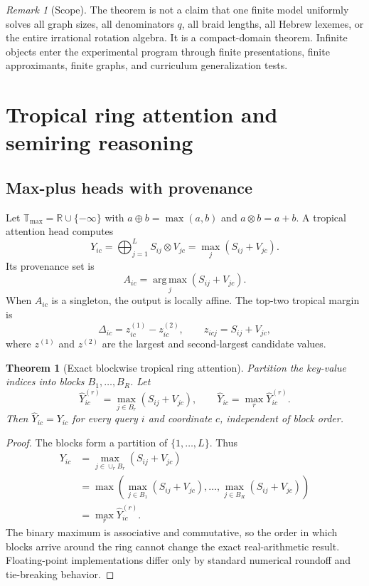 \documentclass[11pt]{article}
\theoremstyle{definition}
\theoremstyle{plain}
\newtheorem{theorem}[definition]{Theorem}
\theoremstyle{remark}
\newtheorem{remark}[definition]{Remark}
\numberwithin{equation}{section}
\newcommand{\R}{\mathbb{R}}
\newcommand{\T}{\mathbb{T}}
\newcommand{\argmax}{\operatorname*{arg\,max}}
\begin{document}
\begin{remark}[Scope]
The theorem is not a claim that one finite model uniformly solves all graph sizes, all denominators $q$, all braid lengths, all Hebrew lexemes, or the entire irrational rotation algebra.  It is a compact-domain theorem.  Infinite objects enter the experimental program through finite presentations, finite approximants, finite graphs, and curriculum generalization tests.
\end{remark}

\section{Tropical ring attention and semiring reasoning}

\subsection{Max-plus heads with provenance}

Let $\T_{\max}=\R\cup\{-\infty\}$ with $a\oplus b=\max(a,b)$ and $a\otimes b=a+b$.  A tropical attention head computes
\begin{equation}
  Y_{ic}=\bigoplus_{j=1}^L S_{ij}\otimes V_{jc}=\max_j(S_{ij}+V_{jc}).
\end{equation}
Its provenance set is
\begin{equation}
  A_{ic}=\argmax_j(S_{ij}+V_{jc}).
\end{equation}
When $A_{ic}$ is a singleton, the output is locally affine.  The top-two tropical margin is
\begin{equation}
  \Delta_{ic}=z_{ic}^{(1)}-z_{ic}^{(2)},\qquad z_{icj}=S_{ij}+V_{jc},
\end{equation}
where $z^{(1)}$ and $z^{(2)}$ are the largest and second-largest candidate values.

\begin{theorem}[Exact blockwise tropical ring attention]
Partition the key-value indices into blocks $B_1,\ldots,B_R$.  Let
\begin{equation}
  \widehat Y_{ic}^{(r)}=\max_{j\in B_r}(S_{ij}+V_{jc}),\qquad
  \widehat Y_{ic}=\max_r\widehat Y_{ic}^{(r)}.
\end{equation}
Then $\widehat Y_{ic}=Y_{ic}$ for every query $i$ and coordinate $c$, independent of block order.
\end{theorem}

\begin{proof}
The blocks form a partition of $\{1,\ldots,L\}$.  Thus
\begin{align}
Y_{ic}
&=\max_{j\in\cup_r B_r}(S_{ij}+V_{jc})\\
&=\max\left(\max_{j\in B_1}(S_{ij}+V_{jc}),\ldots,\max_{j\in B_R}(S_{ij}+V_{jc})\right)\\
&=\max_r\widehat Y_{ic}^{(r)}.
\end{align}
The binary maximum is associative and commutative, so the order in which blocks arrive around the ring cannot change the exact real-arithmetic result.  Floating-point implementations differ only by standard numerical roundoff and tie-breaking behavior.
\end{proof}
\end{document}
